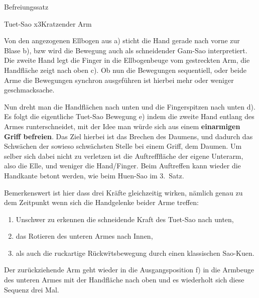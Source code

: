 
\begin{WTSatz}{Befreiungssatz}%

	
	\begin{WTSatzTeil}{Tuet-Sao x3}{Kratzender Arm}
		
		
		Von den angezogenen Ellbogen aus a) sticht die Hand gerade nach vorne zur Blase b), bzw wird die Bewegung auch als schneidender Gam-Sao interpretiert. Die zweite Hand legt die Finger in die Ellbogenbeuge vom gestreckten Arm, die Handfl\"ache zeigt nach oben c). Ob nun die Bewegungen sequentiell, oder beide Arme die Bewegungen synchron ausgef\"uhren ist hierbei mehr oder weniger geschmacksache.
				
		
		Nun dreht man die Handfl\"achen nach unten und die Fingerspitzen nach unten d). Es folgt die eigentliche Tuet-Sao Bewegung e) indem die zweite Hand entlang des Armes runterschneidet, mit der Idee man w\"urde sich aus einem \textbf{einarmigen Griff befreien}. Das Ziel hierbei ist das Brechen des Daumens, und dadurch das Schw\"achen der sowieso schw\"achsten Stelle bei einem Griff, dem Daumen. Um selber sich dabei nicht zu verletzen ist die Auftrefffl\"ache der eigene Unterarm, also die Elle, und weniger die Hand/Finger. Beim Auftreffen kann wieder die Handkante betont werden, wie beim Huen-Sao im 3.~Satz.
		
		Bemerkenswert ist hier dass drei Kr\"afte gleichzeitig wirken, n\"amlich genau zu dem Zeitpunkt wenn sich die Handgelenke beider Arme treffen:
		\begin{enumerate}
			\item Unschwer zu erkennen die schneidende Kraft des Tuet-Sao nach unten,
			\item das Rotieren des unteren Armes nach Innen,
			\item als auch die ruckartige R\"uckw\"rtsbewegung durch einen klassischen Sao-Kuen.
		\end{enumerate}
		
		Der zur\"uckziehende Arm geht wieder in die Ausgangsposition f) in die Armbeuge des unteren Armes mit der Handfl\"ache nach oben und es wiederholt sich diese Sequenz drei Mal.


\end{WTSatzTeil}
\end{WTSatz}

